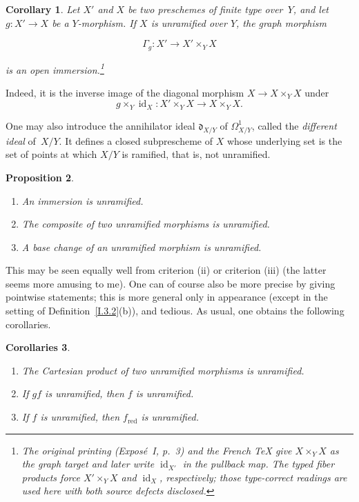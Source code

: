 \documentclass[11pt,oneside]{amsbook}
\newtheorem{proposition}{Proposition}[section]
\newtheorem{corollary}[proposition]{Corollary}
\newtheorem{corollaries}[proposition]{Corollaries}
\begin{document}
\begin{corollary}
\label{I.3.4}
Let \(X'\) and \(X\) be two preschemes of finite type over~\(Y\), and let
\(g\colon X'\to X\) be a \(Y\)-morphism.  If \(X\) is unramified over
\(Y\), the graph morphism

\[
  \Gamma_g\colon X'\longrightarrow X'\times_Y X
\]

is an open immersion.\footnote{The original printing (Expos\'e~I, p.~3) and
the French TeX give \(X\times_Y X\) as the graph target and later write
\(\operatorname{id}_{X'}\) in the pullback map.  The typed fiber products
force \(X'\times_Y X\) and \(\operatorname{id}_X\), respectively; those
type-correct readings are used here with both source defects disclosed.}
\end{corollary}

Indeed, it is the inverse image of the diagonal morphism
\(X\to X\times_Y X\) under
\[
g\times_Y\operatorname{id}_{X}\colon
X'\times_Y X\longrightarrow X\times_Y X.
\]

One may also introduce the annihilator ideal
\(\mathfrak d_{X/Y}\)\label{indnot:af} of \(\Omega^1_{X/Y}\), called the
\emph{different ideal} of~\(X/Y\).  It defines a closed subprescheme of
\(X\) whose underlying set is the set of points at which \(X/Y\) is
ramified, that is, not unramified.

\begin{proposition}
\label{I.3.5}
\begin{enumerate}
\item[(i)] An immersion is unramified.
\item[(ii)] The composite of two unramified morphisms is unramified.
\item[(iii)] A base change of an unramified morphism is unramified.
\end{enumerate}
\end{proposition}

This may be seen equally well from criterion \textup{(ii)} or criterion
\textup{(iii)} (the latter seems more amusing to me).  One can of course
also be more precise by giving pointwise statements; this is more general
only in appearance (except in the setting of Definition~\ref{I.3.2}(b)), and
tedious.  As usual, one obtains the following corollaries.

\begin{corollaries}
\label{I.3.6}
\begin{enumerate}
\item[(iv)] The Cartesian product of two unramified morphisms is unramified.
\item[(v)] If \(gf\) is unramified, then \(f\) is unramified.
\item[(vi)] If \(f\) is unramified, then \(f_{\mathrm{red}}\) is
  unramified.
\end{enumerate}
\end{corollaries}
\end{document}
